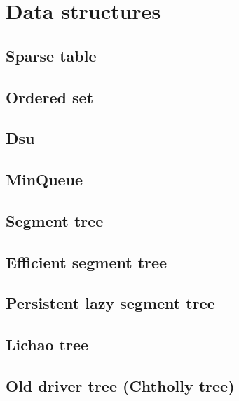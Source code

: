 \section{Data structures}

\subsection{Sparse table}

\subsection{Ordered set}

\subsection{Dsu}

\subsection{MinQueue}

\subsection{Segment tree}

\subsection{Efficient segment tree}

\subsection{Persistent lazy segment tree}

\subsection{Lichao tree}

\subsection{Old driver tree (Chtholly tree)}

